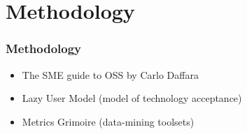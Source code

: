 \section{Methodology}

\begin{frame}%
\frametitle{Methodology}

\begin{itemize}
  \item The SME guide to OSS by Carlo Daffara
  \vspace{0.2cm}
  \item Lazy User Model (model of technology acceptance)
  \vspace{0.2cm}
  \item Metrics Grimoire (data-mining toolsets)
\end{itemize}

\end{frame}